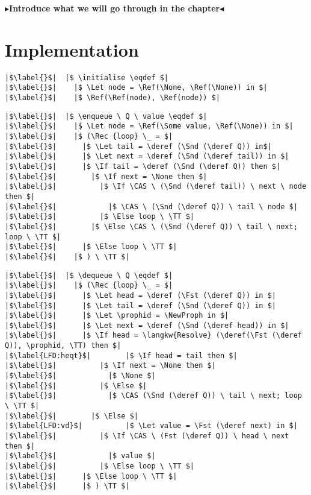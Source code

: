 \documentclass[twoside,11pt,openright]{report}
\newcommand{\initialise}{\operatorname{initialize}}
\newcommand{\enqueue}{\operatorname{enqueue}}
\newcommand{\dequeue}{\operatorname{dequeue}}
\newcommand{\todo}[1]{{\color[rgb]{.5,0,0}\textbf{$\blacktriangleright$#1$\blacktriangleleft$}}}
\begin{document}
\todo{Introduce what we will go through in the chapter}

\section{Implementation}
\label{LFMSQ:section:implementation}

\begin{verbatim}
|$\label{}$|  |$ \initialise \eqdef $|
|$\label{}$|    |$ \Let node = \Ref(\None, \Ref(\None)) in $|
|$\label{}$|    |$ \Ref(\Ref(node), \Ref(node)) $|
\end{verbatim}

\begin{verbatim}
|$\label{}$|  |$ \enqueue \ Q \ value \eqdef $|
|$\label{}$|    |$ \Let node = \Ref(\Some value, \Ref(\None)) in $|
|$\label{}$|    |$ (\Rec {loop} \_ = $|
|$\label{}$|      |$ \Let tail = \deref (\Snd (\deref Q)) in$|
|$\label{}$|      |$ \Let next = \deref (\Snd (\deref tail)) in $|
|$\label{}$|      |$ \If tail = \deref (\Snd (\deref Q)) then $|
|$\label{}$|        |$ \If next = \None then $|
|$\label{}$|          |$ \If \CAS \ (\Snd (\deref tail)) \ next \ node then $|
|$\label{}$|            |$ \CAS \ (\Snd (\deref Q)) \ tail \ node $|
|$\label{}$|          |$ \Else loop \ \TT $|
|$\label{}$|        |$ \Else \CAS \ (\Snd (\deref Q)) \ tail \ next; loop \ \TT $|
|$\label{}$|      |$ \Else loop \ \TT $|
|$\label{}$|    |$ ) \ \TT $|
\end{verbatim}

\begin{verbatim}
|$\label{}$|  |$ \dequeue \ Q \eqdef $|
|$\label{}$|    |$ (\Rec {loop} \_ = $|
|$\label{}$|      |$ \Let head = \deref (\Fst (\deref Q)) in $|
|$\label{}$|      |$ \Let tail = \deref (\Snd (\deref Q)) in $|
|$\label{}$|      |$ \Let \prophid = \NewProph in $|
|$\label{}$|      |$ \Let next = \deref (\Snd (\deref head)) in $|
|$\label{}$|      |$ \If head = \langkw{Resolve} (\deref(\Fst (\deref Q)), \prophid, \TT) then $|
|$\label{LFD:heqt}$|        |$ \If head = tail then $|
|$\label{}$|          |$ \If next = \None then $|
|$\label{}$|            |$ \None $|
|$\label{}$|          |$ \Else $|
|$\label{}$|            |$ \CAS (\Snd (\deref Q)) \ tail \ next; loop \ \TT $|
|$\label{}$|        |$ \Else $|
|$\label{LFD:vd}$|          |$ \Let value = \Fst (\deref next) in $|
|$\label{}$|          |$ \If \CAS \ (Fst (\deref Q)) \ head \ next then $|
|$\label{}$|            |$ value $|
|$\label{}$|          |$ \Else loop \ \TT $|
|$\label{}$|      |$ \Else loop \ \TT $|
|$\label{}$|      |$ ) \TT $|
\end{verbatim}
\end{document}
